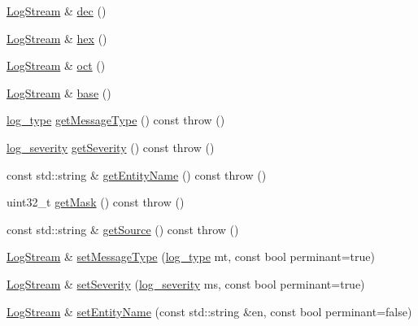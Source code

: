 \begin{DoxyCompactItemize}
\item 
\hyperlink{classkisscpp_1_1_log_stream}{Log\-Stream} \& \hyperlink{classkisscpp_1_1_log_stream_a8ed923f031fb6fd9c981d8c694c16a92}{dec} ()
\item 
\hyperlink{classkisscpp_1_1_log_stream}{Log\-Stream} \& \hyperlink{classkisscpp_1_1_log_stream_afdfaf9b54bf9ab3f95613fff8fe493a1}{hex} ()
\item 
\hyperlink{classkisscpp_1_1_log_stream}{Log\-Stream} \& \hyperlink{classkisscpp_1_1_log_stream_ab8f40d07bbf5dccf2a6c2033405dd2be}{oct} ()
\item 
\hyperlink{classkisscpp_1_1_log_stream}{Log\-Stream} \& \hyperlink{classkisscpp_1_1_log_stream_a857e9c930544fe22317b9be6a7d0d9ce}{base} ()
\item 
\hyperlink{namespacekisscpp_a18db16d1f4c281bec16e637c56b0cc88}{log\-\_\-type} \hyperlink{classkisscpp_1_1_log_stream_ac3448c21e8d5528907744ab2344b170f}{get\-Message\-Type} () const   throw ()
\item 
\hyperlink{namespacekisscpp_a2479a56cdedf21357ca5c68adc699d00}{log\-\_\-severity} \hyperlink{classkisscpp_1_1_log_stream_a8deec7dc1e77cdf99e99d8be56660151}{get\-Severity} () const   throw ()
\item 
const std\-::string \& \hyperlink{classkisscpp_1_1_log_stream_a37cf1aef25583d4544d149d5f2c7abe6}{get\-Entity\-Name} () const   throw ()
\item 
uint32\-\_\-t \hyperlink{classkisscpp_1_1_log_stream_a0c7407111930ad9eb1249478b788f4dc}{get\-Mask} () const   throw ()
\item 
const std\-::string \& \hyperlink{classkisscpp_1_1_log_stream_a9c62fef30deb7557b7920580ab4a389a}{get\-Source} () const   throw ()
\item 
\hyperlink{classkisscpp_1_1_log_stream}{Log\-Stream} \& \hyperlink{classkisscpp_1_1_log_stream_adf597c630a454a9a84be5f2b0ade08af}{set\-Message\-Type} (\hyperlink{namespacekisscpp_a18db16d1f4c281bec16e637c56b0cc88}{log\-\_\-type} mt, const bool perminant=true)
\item 
\hyperlink{classkisscpp_1_1_log_stream}{Log\-Stream} \& \hyperlink{classkisscpp_1_1_log_stream_a51e9ca608e2ed914d127bccdb2148837}{set\-Severity} (\hyperlink{namespacekisscpp_a2479a56cdedf21357ca5c68adc699d00}{log\-\_\-severity} ms, const bool perminant=true)
\item 
\hyperlink{classkisscpp_1_1_log_stream}{Log\-Stream} \& \hyperlink{classkisscpp_1_1_log_stream_adaf27d5069674b2e934883c107187686}{set\-Entity\-Name} (const std\-::string \&en, const bool perminant=false)

\end{DoxyCompactItemize}
